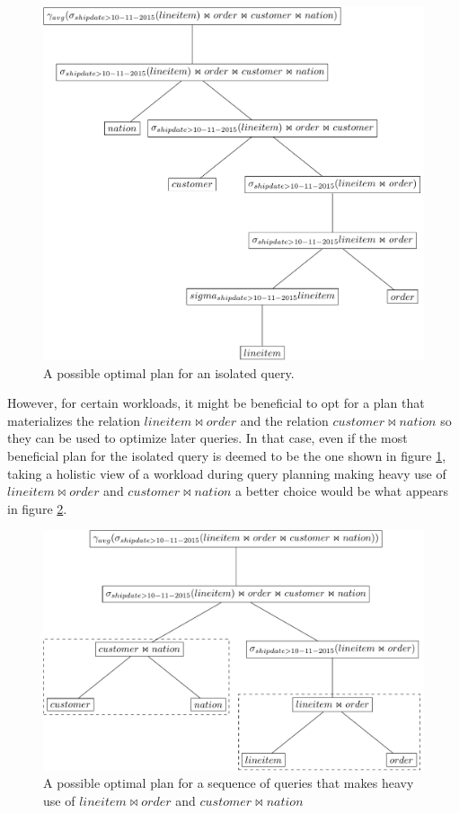 \begin{figure}[H]
  \centering
  \includegraphics[width=.9\linewidth]{./imgs/optplan.pdf}
  \caption{\label{fig:optplan}A possible optimal plan for an isolated
    query.}
\end{figure}

However, for certain workloads, it might be beneficial to opt for
a plan that materializes the relation \(lineitem \Join order\) and the
relation \(customer \Join nation\) so they can be used to optimize
later queries. In that case, even if the most beneficial plan for the
isolated query is deemed to be the one shown in figure \ref{fig:optplan},
taking a holistic view of a workload during query planning making
heavy use of \(lineitem \Join order\) and \(customer \Join nation\) a
better choice would be what appears in figure \ref{fig:workplan}.

\begin{figure}[H]
  \centering
  \includegraphics[width=.9\linewidth]{./imgs/workplan.pdf}
  \caption{\label{fig:workplan}A possible optimal plan for a sequence
    of queries that makes heavy use of \(lineitem \Join order\) and
    \(customer \Join nation\)}
\end{figure}

